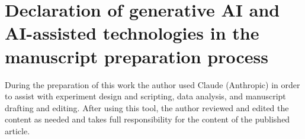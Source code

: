 \documentclass[a4paper,fleqn]{cas-dc}
\begin{document}
\printcredits

\section*{Declaration of generative AI and AI-assisted technologies in the manuscript preparation process}

During the preparation of this work the author used Claude (Anthropic) in order to assist with experiment design and scripting, data analysis, and manuscript drafting and editing. After using this tool, the author reviewed and edited the content as needed and takes full responsibility for the content of the published article.



\end{document}
